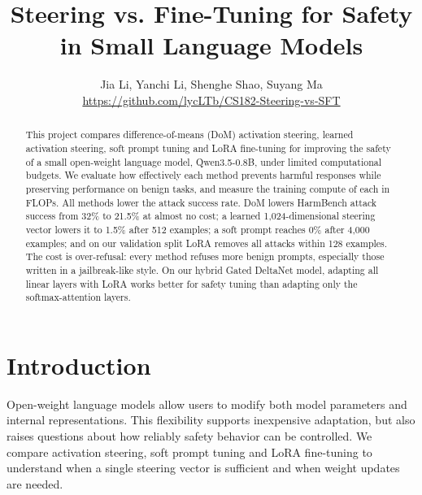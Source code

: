 \documentclass{article}
\title{Steering vs. Fine-Tuning for Safety in Small Language Models}
\author{Jia Li, Yanchi Li, Shenghe Shao, Suyang Ma\\ \url{https://github.com/lycLTb/CS182-Steering-vs-SFT}}
\begin{document}
\maketitle

\begin{abstract}
This project compares difference-of-means (DoM) activation steering, learned activation steering, soft prompt tuning and LoRA fine-tuning for improving the safety of a small open-weight language model, Qwen3.5-0.8B, under limited computational budgets. We evaluate how effectively each method prevents harmful responses while preserving performance on benign tasks, and measure the training compute of each in FLOPs. All methods lower the attack success rate. DoM lowers HarmBench attack success from 32\% to 21.5\% at almost no cost; a learned 1,024-dimensional steering vector lowers it to 1.5\% after 512 examples; a soft prompt reaches 0\% after 4,000 examples; and on our validation split LoRA removes all attacks within 128 examples. The cost is over-refusal: every method refuses more benign prompts, especially those written in a jailbreak-like style. On our hybrid Gated DeltaNet model, adapting all linear layers with LoRA works better for safety tuning than adapting only the softmax-attention layers.
\end{abstract}


\section{Introduction}\label{sec:1}

Open-weight language models allow users to modify both model parameters and internal representations. This flexibility supports inexpensive adaptation, but also raises questions about how reliably safety behavior can be controlled. We compare activation steering, soft prompt tuning and LoRA fine-tuning to understand when a single steering vector is sufficient and when weight updates are needed.
\end{document}

